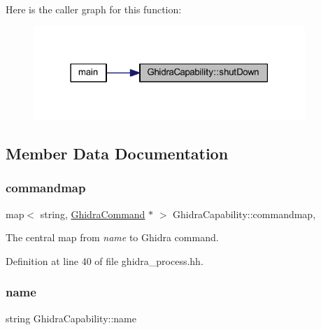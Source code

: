 Here is the caller graph for this function\+:
\nopagebreak
\begin{figure}[H]
\begin{center}
\leavevmode
\includegraphics[width=291pt]{class_ghidra_capability_a3fd0105536597651f42c98ed1dbc2b7e_icgraph}
\end{center}
\end{figure}


\subsection{Member Data Documentation}
\mbox{\label{class_ghidra_capability_a01f9c0ce45ccac28d5fa79d75c752587}} 
\subsubsection{\texorpdfstring{commandmap}{commandmap}}
{\footnotesize\ttfamily map$<$ string, \mbox{\hyperlink{class_ghidra_command}{Ghidra\+Command}} $\ast$ $>$ Ghidra\+Capability\+::commandmap\hspace{0.3cm}{\ttfamily [static]}, {\ttfamily [protected]}}



The central map from {\itshape name} to Ghidra command. 



Definition at line 40 of file ghidra\+\_\+process.\+hh.

\mbox{\label{class_ghidra_capability_acb74036589d576cd7241c92337ca0eb4}} 
\subsubsection{\texorpdfstring{name}{name}}
{\footnotesize\ttfamily string Ghidra\+Capability\+::name\hspace{0.3cm}{\ttfamily [protected]}}



